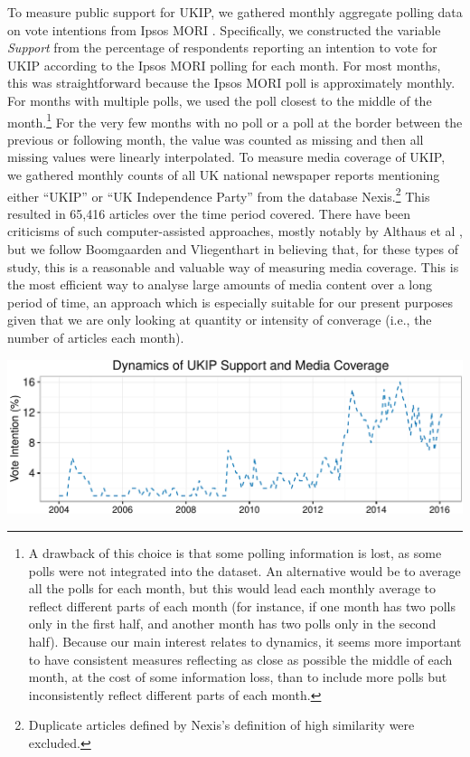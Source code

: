\documentclass[12pt,]{article}
\makeatletter
\def\maxwidth{\ifdim\Gin@nat@width>\linewidth\linewidth
\else\Gin@nat@width\fi}
\let\Oldincludegraphics\includegraphics
\renewcommand{\includegraphics}[1]{\Oldincludegraphics[width=\maxwidth]{#1}}
\makeatother
\begin{document}
To measure public support for UKIP, we gathered monthly aggregate
polling data on vote intentions from Ipsos MORI
\citep{IpsosMORI:gm2fXYNK}. Specifically, we constructed the variable
\emph{Support} from the percentage of respondents reporting an intention
to vote for UKIP according to the Ipsos MORI polling for each month. For
most months, this was straightforward because the Ipsos MORI poll is
approximately monthly. For months with multiple polls, we used the poll
closest to the middle of the
month.\footnote{A drawback of this choice is that some polling information is lost, as some polls were not integrated into the dataset. An alternative would be to average all the polls for each month, but this would lead each monthly average to reflect different parts of each month (for instance, if one month has two polls only in the first half, and another month has two polls only in the second half). Because our main interest relates to dynamics, it seems more important to have consistent measures reflecting as close as possible the middle of each month, at the cost of some information loss, than to include more polls but inconsistently reflect different parts of each month.}
For the very few months with no poll or a poll at the border between the
previous or following month, the value was counted as missing and then
all missing values were linearly interpolated. To measure media coverage
of UKIP, we gathered monthly counts of all UK national newspaper reports
mentioning either ``UKIP'' or ``UK Independence Party'' from the
database
Nexis.\footnote{Duplicate articles defined by Nexis's definition of high similarity were excluded.}
This resulted in 65,416 articles over the time period covered. There
have been criticisms of such computer-assisted approaches, mostly
notably by Althaus et al \citeyearpar{althaus_using_2001}, but we follow
Boomgaarden and Vliegenthart \citeyearpar{Boomgaarden:2007ia} in
believing that, for these types of study, this is a reasonable and
valuable way of measuring media coverage. This is the most efficient way
to analyse large amounts of media content over a long period of time, an
approach which is especially suitable for our present purposes given
that we are only looking at quantity or intensity of converage (i.e.,
the number of articles each month).

\setlength\parindent{0pt}

\includegraphics{ukip_media_files/figure-latex/unnamed-chunk-1-1.pdf}
\end{document}
